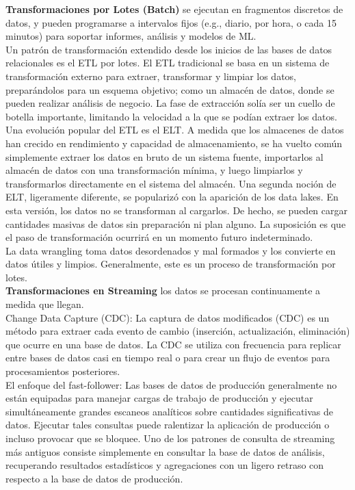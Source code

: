 \documentclass[12pt]{book}
\begin{document}
\textbf{Transformaciones por Lotes (Batch)} se ejecutan en fragmentos discretos de datos, y pueden programarse a intervalos fijos (e.g., diario, por hora, o cada 15 minutos) para soportar informes, análisis y modelos de ML. \\
Un patrón de transformación extendido desde los inicios de las bases de datos relacionales es el ETL por lotes. El ETL tradicional se basa en un sistema de transformación externo para extraer, transformar y limpiar los datos, preparándolos para un esquema objetivo; como un almacén de datos, donde se pueden realizar análisis de negocio. La fase de extracción solía ser un cuello de botella importante, limitando la velocidad a la que se podían extraer los datos.\\
Una evolución popular del ETL es el ELT. A medida que los almacenes de datos han crecido en rendimiento y capacidad de almacenamiento, se ha vuelto común simplemente extraer los datos en bruto de un sistema fuente, importarlos al almacén de datos con una transformación mínima, y luego limpiarlos y transformarlos directamente en el sistema del almacén. Una segunda noción de ELT, ligeramente diferente, se popularizó con la aparición de los data lakes. En esta versión, los datos no se transforman al cargarlos. De hecho, se pueden cargar cantidades masivas de datos sin preparación ni plan alguno. La suposición es que el paso de transformación ocurrirá en un momento futuro indeterminado.\\
La data wrangling toma datos desordenados y mal formados y los convierte en datos útiles y limpios. Generalmente, este es un proceso de transformación por lotes.\\

\textbf{Transformaciones en Streaming} los datos se procesan continuamente a medida que llegan.\\
Change Data Capture (CDC): La captura de datos modificados (CDC) es un método para extraer cada evento de cambio (inserción, actualización, eliminación) que ocurre en una base de datos. La CDC se utiliza con frecuencia para replicar entre bases de datos casi en tiempo real o para crear un flujo de eventos para procesamientos posteriores.\\
El enfoque del fast-follower: Las bases de datos de producción generalmente no están equipadas para manejar cargas de trabajo de producción y ejecutar simultáneamente grandes escaneos analíticos sobre cantidades significativas de datos. Ejecutar tales consultas puede ralentizar la aplicación de producción o incluso provocar que se bloquee. Uno de los patrones de consulta de streaming más antiguos consiste simplemente en consultar la base de datos de análisis, recuperando resultados estadísticos y agregaciones con un ligero retraso con respecto a la base de datos de producción.\\
\end{document}
